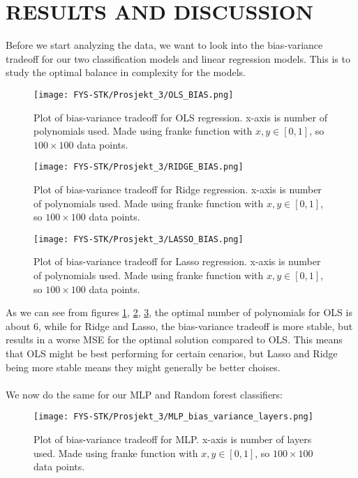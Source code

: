 \documentclass[english,notitlepage,reprint,nofootinbib]{revtex4-1}  %
\begin{document}
\section{RESULTS AND DISCUSSION}\label{sec: DISCUSSION}
Before we start analyzing the data, we want to look into the bias-variance tradeoff for our two classification models and linear regression models. This is to study the optimal balance in complexity for the models.  

\begin{figure}[H]
    \centering
    \texttt{[image: FYS-STK/Prosjekt\_3/OLS\_BIAS.png]}
    \caption{Plot of bias-variance tradeoff for OLS regression. x-axis is number of polynomials used. Made using franke function with $x,y \in [0,1]$, so $100 \times 100$ data points.}
    \label{fig: OLS_BIAS}
\end{figure}

\begin{figure}[H]
    \centering
    \texttt{[image: FYS-STK/Prosjekt\_3/RIDGE\_BIAS.png]}
    \caption{Plot of bias-variance tradeoff for Ridge regression. x-axis is number of polynomials used. Made using franke function with $x,y \in [0,1]$, so $100 \times 100$ data points.}
    \label{fig: RIDGE_BIAS}
\end{figure}

\begin{figure}[H]
    \centering
    \texttt{[image: FYS-STK/Prosjekt\_3/LASSO\_BIAS.png]}
    \caption{Plot of bias-variance tradeoff for Lasso regression. x-axis is number of polynomials used. Made using franke function with $x,y \in [0,1]$, so $100 \times 100$ data points.}
    \label{fig: LASSO_BIAS}
\end{figure}

As we can see from figures \ref{fig: OLS_BIAS}, \ref{fig: RIDGE_BIAS}, \ref{fig: LASSO_BIAS}, the optimal number of polynomials for OLS is about 6, while for Ridge and Lasso, the bias-variance tradeoff is more stable, but results in a worse MSE for the optimal solution compared to OLS.
This means that OLS might be best performing for certain cenarios, but Lasso and Ridge being more stable means they might generally be better choises.
\\
\\
We now do the same for our MLP and Random forest classifiers:

\begin{figure}[H]
    \centering
    \texttt{[image: FYS-STK/Prosjekt\_3/MLP\_bias\_variance\_layers.png]}
    \caption{Plot of bias-variance tradeoff for MLP. x-axis is number of layers used. Made using franke function with $x,y \in [0,1]$, so $100 \times 100$ data points.}
    \label{fig: MLP_BIAS}
\end{figure}
\end{document}
